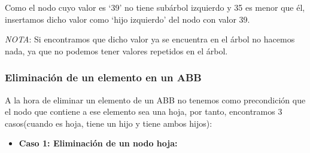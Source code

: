 Como el nodo cuyo valor es `39' no tiene subárbol izquierdo y 35 es menor que él, insertamos dicho valor como `hijo izquierdo' del nodo con valor 39.

\textit{NOTA}: Si encontramos que dicho valor ya se encuentra en el árbol no hacemos nada, ya que no podemos tener valores repetidos en el árbol.
\newpage
\subsubsection*{Eliminación de un elemento en un ABB}
A la hora de eliminar un elemento de un ABB no tenemos como precondición que el nodo que contiene a ese elemento sea una hoja, por tanto, encontramos 3 casos(cuando es hoja, tiene un hijo y tiene ambos hijos):

\begin{itemize}
  \item \textbf{Caso 1: Eliminación de un nodo hoja:}
  

\end{itemize}
